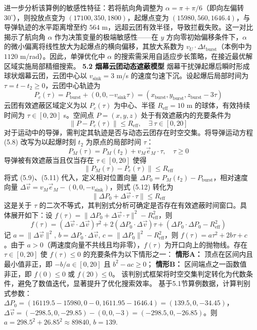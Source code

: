 \documentclass{JXUSTmodeling}
\begin{document}
进一步分析该算例的敏感性特征：若将航向角调整为 $\alpha=\pi+\pi/6$（即向左偏转 $30^\circ$），则投放点变为 $(17100, 350, 1800)$，起爆点变为 $(15980, 560, 1646.4)$，与导弹轨迹的水平距离增至约 $564$ m，远超云团有效半径，导致拦截失败。这一对比揭示了航向角 $\alpha$ 作为决策变量的极端敏感性——在 $y$ 方向零初始偏移条件下，$\alpha$ 的微小偏离将线性放大为起爆点的横向偏移，其放大系数为 $v_U\cdot\Delta t_{\text{burst}}$（本例中为 $1120$ m/rad）。因此，单弹优化中 $\alpha$ 的搜索需采用自适应步长策略，在接近最优解区域实施局部精细搜索。
\textbf{5.2 烟幕云团动态遮蔽模型}
烟幕干扰弹起爆后瞬时形成球状烟幕云团，云团中心以 $v_{\text{sink}}=3$ m/s 的速度匀速下沉。设起爆后局部时间为 $\tau=t-t_2\geq 0$，云团中心轨迹为
\begin{equation}
P_c(\tau)=P_{\text{burst}}+(0, 0, -v_{\text{sink}}\tau)=(x_{\text{burst}}, y_{\text{burst}}, z_{\text{burst}}-3\tau) \tag{5.9}
\end{equation}
云团有效遮蔽区域定义为以 $P_c(\tau)$ 为中心、半径 $R_{\text{eff}}=10$ m 的球体，有效持续时间为 $\tau\in[0, 20]$ s。空间点 $P=(x,y,z)$ 处于有效遮蔽内的充要条件为
\begin{equation}
\|P-P_c(\tau)\|\leq R_{\text{eff}},\quad \exists\ \tau\in[0,20] \tag{5.10}
\end{equation}
对于运动中的导弹，需判定其轨迹是否与动态云团存在时空交集。将导弹运动方程 (5.8) 改写为以起爆时刻 $t_2$ 为原点的局部时间 $\tau$：
\begin{equation}
P_M(\tau)=P_M(t_2)+v_M\vec{e}_M\cdot\tau,\quad \tau\geq 0 \tag{5.11}
\end{equation}
导弹被有效遮蔽当且仅当存在 $\tau\in[0,20]$ 使得
\begin{equation}
\|P_M(\tau)-P_c(\tau)\|\leq R_{\text{eff}} \tag{5.12}
\end{equation}
将式 (5.9)、(5.11) 代入，定义相对位置向量 $\Delta P_0=P_M(t_2)-P_{\text{burst}}$，相对速度向量 $\Delta\vec{v}=v_M\vec{e}_M-(0,0,-v_{\text{sink}})$，则式 (5.12) 转化为
\begin{equation}
\|\Delta P_0+\Delta\vec{v}\cdot\tau\|\leq R_{\text{eff}} \tag{5.13}
\end{equation}
这是关于 $\tau$ 的二次不等式，其判别式分析可确定是否存在有效遮蔽时间窗口。具体展开如下：设 $f(\tau)=\|\Delta P_0+\Delta\vec{v}\cdot\tau\|^2-R_{\text{eff}}^2$，则
\begin{equation}
f(\tau)=(\Delta\vec{v}\cdot\Delta\vec{v})\tau^2+2(\Delta P_0\cdot\Delta\vec{v})\tau+(\Delta P_0\cdot\Delta P_0-R_{\text{eff}}^2) \tag{5.13a}
\end{equation}
记 $a=\|\Delta\vec{v}\|^2$, $b=\Delta P_0\cdot\Delta\vec{v}$, $c=\|\Delta P_0\|^2-R_{\text{eff}}^2$，则 $f(\tau)=a\tau^2+2b\tau+c$。由于 $a>0$（两速度向量不共线且均非零），$f(\tau)$ 为开口向上的抛物线。存在 $\tau\in[0,20]$ 使 $f(\tau)\leq 0$ 的充要条件为以下情形之一：
\textbf{情形A：} 顶点在区间内且最小值非正，即 $-b/a\in[0,20]$ 且 $b^2-ac\geq 0$；
\textbf{情形B：} 区间端点之一函数值非正，即 $f(0)\leq 0$ 或 $f(20)\leq 0$。
该判别式框架将时空交集判定转化为代数条件，避免了数值迭代，显著提升了优化搜索效率。
基于5.1节算例数据，计算判别式参数：$\Delta P_0=(16119.5-15980, 0-0, 1611.95-1646.4)=(139.5, 0, -34.45)$，$\Delta\vec{v}=(-298.5, 0, -29.85)-(0,0,-3)=(-298.5, 0, -26.85)$。则 $a=298.5^2+26.85^2\approx89840$, $b=139.$
\end{document}

